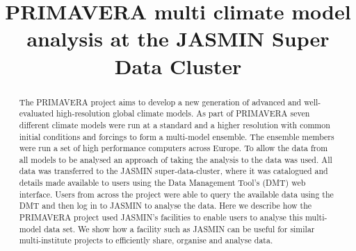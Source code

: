 \documentclass[gmd, manuscript]{copernicus}
\begin{document}
\title{PRIMAVERA multi climate model analysis at the JASMIN Super Data Cluster}













\received{}
\pubdiscuss{} %
\revised{}
\accepted{}
\published{}




\maketitle



\begin{abstract}
The PRIMAVERA project aims to develop a new generation of advanced and well-evaluated high-resolution global climate models. As part of PRIMAVERA seven different climate models were run at a standard and a higher resolution with common initial conditions and forcings to form a multi-model ensemble. The ensemble members were run a set of high performance computers across Europe. To allow the data from all models to be analysed an approach of taking the analysis to the data was used. All data was transferred to the JASMIN super-data-cluster, where it was catalogued and details made available to users using the Data Management Tool's (DMT) web interface. Users from across the project were able to query the available data using the DMT and then log in to JASMIN to analyse the data. Here we describe how the PRIMAVERA project used JASMIN's facilities to enable users to analyse this multi-model data set. We show how a facility such as JASMIN can be useful for similar multi-institute projects to efficiently share, organise and analyse data.
\end{abstract}
\end{document}
